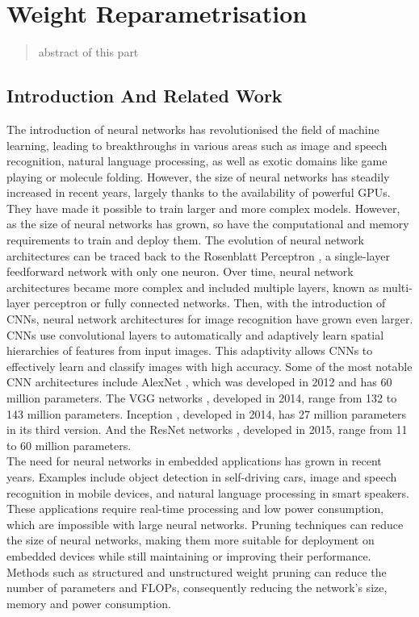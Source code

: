 \chapter{Weight Reparametrisation}

\localtableofcontents

\begin{abstract}
    abstract of this part
\end{abstract}

\section{Introduction And Related Work}
The introduction of neural networks has revolutionised the field of machine
learning, leading to breakthroughs in various areas such as image and speech
recognition, natural language processing, as well as exotic domains like game
playing or molecule folding. However, the size of neural networks has steadily
increased in recent years, largely thanks to the availability of powerful
\ac{GPUs}. They have made it possible to train larger and more complex models.
However, as the size of neural networks has grown, so have the computational and
memory requirements to train and deploy them. The evolution of neural network
architectures can be traced back to the Rosenblatt Perceptron
\cite{rosenblatt1958perceptron}, a single-layer feedforward network with only
one neuron. Over time, neural network architectures became more complex and
included multiple layers, known as multi-layer perceptron or fully connected
networks. Then, with the introduction of \ac{CNNs}, neural network architectures
for image recognition have grown even larger. \ac{CNNs} use
convolutional layers to automatically and adaptively learn spatial hierarchies
of features from input images. This adaptivity allows \ac{CNNs} to effectively
learn and classify images with high accuracy. Some of the most notable \ac{CNN}
architectures include AlexNet \cite{DBLP:conf/nips/KrizhevskySH12}, which was
developed in 2012 and has 60 million parameters. The VGG networks
\cite{DBLP:journals/corr/SimonyanZ14a}, developed in 2014, range from 132 to 143
million parameters. Inception \cite{DBLP:conf/cvpr/SzegedyLJSRAEVR15}, developed
in 2014, has 27 million parameters in its third version. And the ResNet networks
\cite{DBLP:conf/cvpr/HeZRS16}, developed in 2015, range from 11 to 60
million parameters. \\


The need for neural networks in embedded applications has grown in recent years.
Examples include object detection in self-driving cars, image and speech
recognition in mobile devices, and natural language processing in smart
speakers. These applications require real-time processing and low power
consumption, which are impossible with large neural networks. Pruning techniques
can reduce the size of neural networks, making them more suitable for deployment
on embedded devices while still maintaining or improving their performance.
Methods such as structured and unstructured weight pruning can reduce the number
of parameters and \ac{FLOPs}, consequently reducing the network's size, memory and
power consumption.\\


